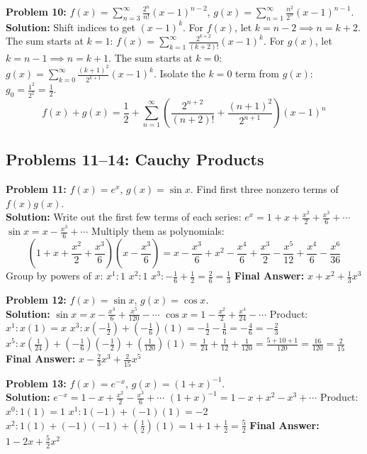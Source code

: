 \documentclass[11pt, letterpaper]{article}
\theoremstyle{definition}
\theoremstyle{remark}
\begin{document}
\textbf{Problem 10:} $f(x) = \sum_{n=3}^{\infty} \frac{2^n}{n!} (x-1)^{n-2}$, $g(x) = \sum_{n=1}^{\infty} \frac{n^2}{2^n} (x-1)^{n-1}$.
\\[6pt]
\textbf{Solution:} Shift indices to get $(x-1)^k$.
For $f(x)$, let $k = n-2 \implies n = k+2$. The sum starts at $k=1$: $f(x) = \sum_{k=1}^{\infty} \frac{2^{k+2}}{(k+2)!} (x-1)^k$.
For $g(x)$, let $k = n-1 \implies n = k+1$. The sum starts at $k=0$: $g(x) = \sum_{k=0}^{\infty} \frac{(k+1)^2}{2^{k+1}} (x-1)^k$.
Isolate the $k=0$ term from $g(x)$: $g_0 = \frac{1^2}{2^1} = \frac{1}{2}$.
\[ f(x) + g(x) = \frac{1}{2} + \sum_{n=1}^{\infty} \left( \frac{2^{n+2}}{(n+2)!} + \frac{(n+1)^2}{2^{n+1}} \right) (x-1)^n \]

\subsection{Problems 11--14: Cauchy Products}
\textbf{Problem 11:} $f(x) = e^x$, $g(x) = \sin x$. Find first three nonzero terms of $f(x)g(x)$.
\\[6pt]
\textbf{Solution:} Write out the first few terms of each series:
$e^x = 1 + x + \frac{x^2}{2} + \frac{x^3}{6} + \cdots$
$\sin x = x - \frac{x^3}{6} + \cdots$
Multiply them as polynomials:
\[ (1 + x + \frac{x^2}{2} + \frac{x^3}{6})(x - \frac{x^3}{6}) = x - \frac{x^3}{6} + x^2 - \frac{x^4}{6} + \frac{x^3}{2} - \frac{x^5}{12} + \frac{x^4}{6} - \frac{x^6}{36} \]
Group by powers of $x$:
$x^1: 1$
$x^2: 1$
$x^3: -\frac{1}{6} + \frac{1}{2} = \frac{2}{6} = \frac{1}{3}$
\textbf{Final Answer:} $x + x^2 + \frac{1}{3}x^3$

\textbf{Problem 12:} $f(x) = \sin x$, $g(x) = \cos x$.
\\[6pt]
\textbf{Solution:}
$\sin x = x - \frac{x^3}{6} + \frac{x^5}{120} - \cdots$
$\cos x = 1 - \frac{x^2}{2} + \frac{x^4}{24} - \cdots$
Product:
$x^1: x(1) = x$
$x^3: x(-\frac{1}{2}) + (-\frac{1}{6})(1) = -\frac{1}{2} - \frac{1}{6} = -\frac{4}{6} = -\frac{2}{3}$
$x^5: x(\frac{1}{24}) + (-\frac{1}{6})(-\frac{1}{2}) + (\frac{1}{120})(1) = \frac{1}{24} + \frac{1}{12} + \frac{1}{120} = \frac{5 + 10 + 1}{120} = \frac{16}{120} = \frac{2}{15}$
\textbf{Final Answer:} $x - \frac{2}{3}x^3 + \frac{2}{15}x^5$

\textbf{Problem 13:} $f(x) = e^{-x}$, $g(x) = (1+x)^{-1}$.
\\[6pt]
\textbf{Solution:}
$e^{-x} = 1 - x + \frac{x^2}{2} - \frac{x^3}{6} + \cdots$
$(1+x)^{-1} = 1 - x + x^2 - x^3 + \cdots$
Product:
$x^0: 1(1) = 1$
$x^1: 1(-1) + (-1)(1) = -2$
$x^2: 1(1) + (-1)(-1) + (\frac{1}{2})(1) = 1 + 1 + \frac{1}{2} = \frac{5}{2}$
\textbf{Final Answer:} $1 - 2x + \frac{5}{2}x^2$
\end{document}
